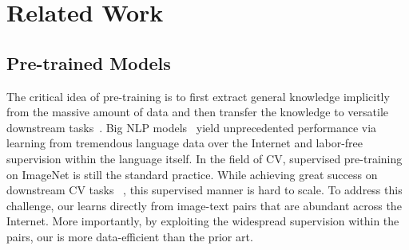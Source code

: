 \section{Related Work}

\subsection{Pre-trained Models}
The critical idea of pre-training is to first extract general knowledge implicitly from the massive amount of data and then transfer the knowledge to versatile downstream tasks~\citep{han2021pre}. 
Big NLP models~\citep{devlin2018bert, brown2020language} yield unprecedented performance via learning from tremendous language data over the Internet and labor-free supervision within the language itself.
In the field of CV, supervised pre-training on ImageNet is still the standard practice. 
While achieving great success on downstream CV tasks~\citep{girshick2014rich, long2015fully, vinyals2015show} , this supervised manner is hard to scale.
To address this challenge, our \workname learns directly from image-text pairs that are abundant across the Internet. More importantly, by exploiting the widespread supervision within the pairs, our \workname is more data-efficient than the prior art.

